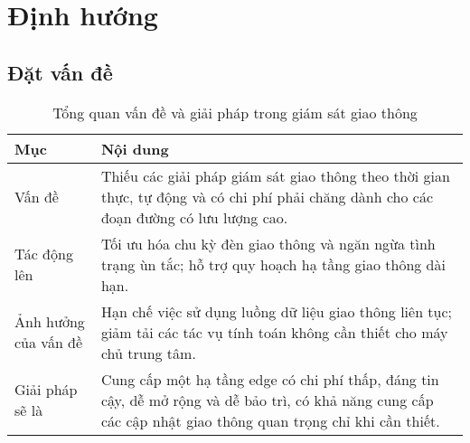 

\section{Định hướng}
\subsection{Đặt vấn đề}
\begin{table}[h!]
    \centering
    \begin{tabular}{|p{4cm}|p{10cm}|}
    \hline
    \textbf{Mục} & \textbf{Nội dung} \\
    \hline
    Vấn đề & Thiếu các giải pháp giám sát giao thông theo thời gian thực, tự động và có chi phí phải chăng dành cho các đoạn đường có lưu lượng cao. \\
    \hline
    Tác động lên & Tối ưu hóa chu kỳ đèn giao thông và ngăn ngừa tình trạng ùn tắc; hỗ trợ quy hoạch hạ tầng giao thông dài hạn. \\
    \hline
    Ảnh hưởng của vấn đề & Hạn chế việc sử dụng luồng dữ liệu giao thông liên tục; giảm tải các tác vụ tính toán không cần thiết cho máy chủ trung tâm. \\
    \hline
    Giải pháp sẽ là & Cung cấp một hạ tầng edge có chi phí thấp, đáng tin cậy, dễ mở rộng và dễ bảo trì, có khả năng cung cấp các cập nhật giao thông quan trọng chỉ khi cần thiết. \\
    \hline
    \end{tabular}
    \caption{Tổng quan vấn đề và giải pháp trong giám sát giao thông}
    \label{tab:traffic_solution}
\end{table}

